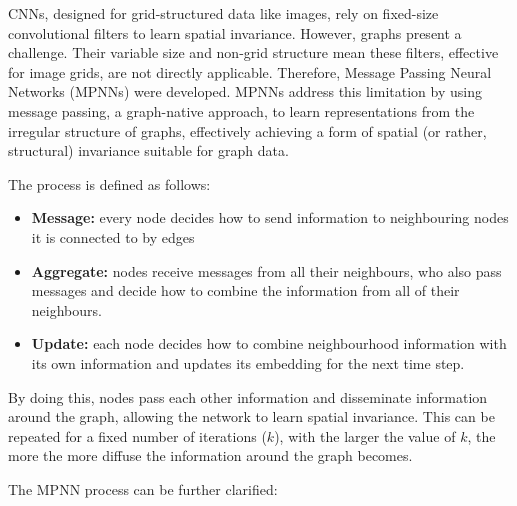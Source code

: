 \documentclass[10pt,oneside]{book}
\begin{document}
\begin{tcolorbox}[title=Message Passing Neural Networks in \gls*{gnn}s]  
\small
    CNNs, designed for grid-structured data like images, rely on fixed-size convolutional filters to learn spatial invariance. However, graphs present a challenge. Their variable size and non-grid structure mean these filters, effective for image grids, are not directly applicable. Therefore, Message Passing Neural Networks (MPNNs) were developed. MPNNs address this limitation by using message passing, a graph-native approach, to learn representations from the irregular structure of graphs, effectively achieving a form of spatial (or rather, structural) invariance suitable for graph data.

    The process is defined as follows:
    \begin{itemize}
        \item {\bf{Message:}} every node decides how to send information to neighbouring nodes it is connected to by edges
        \item {\bf{Aggregate:}} nodes receive messages from all their neighbours, who also pass messages and decide how to combine the information from all of their neighbours. 
        \item {\bf{Update:}} each node decides how to combine neighbourhood information with its own information and updates its embedding for the next time step. 
    \end{itemize}

    By doing this, nodes pass each other information and disseminate information around the graph, allowing the network to learn spatial invariance.  This can be repeated for a fixed number of iterations ($k$), with the larger the value of $k$, the more the more diffuse the information around the graph becomes.

    The MPNN process can be further clarified:


\end{tcolorbox}
\end{document}
